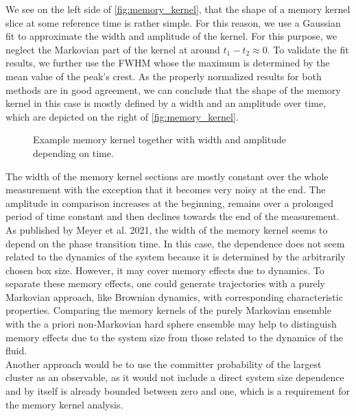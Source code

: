 We see on the left side of \autoref{fig:memory_kernel}, that the shape of a memory kernel slice at some reference time is rather simple. For this reason, we use a Gaussian fit to approximate the width and amplitude of the kernel. For this purpose, we neglect the Markovian part of the kernel at around $t_1-t_2 \approx 0$. To validate the fit results, we further use the FWHM whose the maximum is determined by the mean value of the peak's crest. As the properly normalized results for both methods are in good agreement, we can conclude that the shape of the memory kernel in this case is mostly defined by a width and an amplitude over time, which are depicted on the right of \autoref{fig:memory_kernel}.\\
\begin{figure}[h]
\begin{center}
 \hspace{0.5cm}
\caption[Width and amplitude of memory kernel alongside an example slice]{Example memory kernel together with width and amplitude depending on time.}
\label{fig:memory_kernel}
\end{center}
\end{figure}
The width of the memory kernel sections are mostly constant over the whole measurement with the exception that it becomes very noisy at the end. The amplitude in comparison increases at the beginning, remains over a prolonged period of time constant and then declines towards the end of the measurement.\\
As published by Meyer et al. 2021\cite{Meyer2021}, the width of the memory kernel seems to depend on the phase transition time. In this case, the dependence does not seem related to the dynamics of the system because it is determined by the arbitrarily chosen box size. However, it may cover memory effects due to dynamics. To separate these memory effects, one could generate trajectories with a purely Markovian approach, like Brownian dynamics, with corresponding characteristic properties. Comparing the memory kernels of the purely Markovian ensemble with the a priori non-Markovian hard sphere ensemble may help to distinguish memory effects due to the system size from those related to the dynamics of the fluid.\\

Another approach would be to use the committer probability of the largest cluster as an observable, as it would not include a direct system size dependence and by itself is already bounded between zero and one, which is a requirement for the memory kernel analysis.
\FloatBarrier
